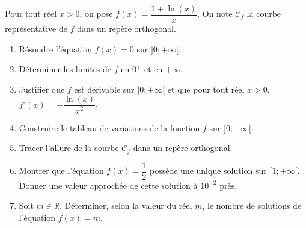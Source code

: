 \documentclass[11pt,fleqn, openany]{book} %
\begin{document}
\begin{exercise}Pour tout réel $x>0$, on pose $f(x)=\dfrac{1+\ln(x)}{x}$.
On note $\mathcal{C}_f$ la courbe représentative de $f$ dans un repère orthogonal.
\begin{enumerate}
\item Résoudre l'équation $f(x)=0$ sur $]0;+\infty[$.
\item Déterminer les limites de $f$ en $0^+$ et en $+\infty$.
\item Justifier que $f$ est dérivable sur $]0;+\infty[$ et que pour tout réel $x>0$, $f'(x)=-\dfrac{\ln(x)}{x^2}$.
\item Construire le tableau de variations de la fonction $f$ sur $]0;+\infty[$. 
\item Tracer l'allure de la courbe $\mathcal{C}_f$ dans un repère orthogonal.
\item Montrer que l'équation $f(x)=\dfrac{1}{2}$ possède une unique solution sur $[1;+\infty[$. Donner une valeur approchée de cette solution à $10^{-2}$ près.
\item Soit $m \in \mathbb{R}$. Déterminer, selon la valeur du réel $m$, le nombre de solutions de l'équation $f(x)=m$.
\end{enumerate}
\end{exercise}
\end{document}
